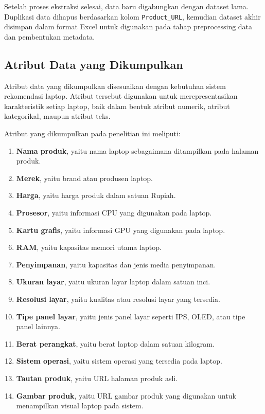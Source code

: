 Setelah proses ekstraksi selesai, data baru digabungkan dengan dataset lama. Duplikasi data dihapus berdasarkan kolom \texttt{Product\_URL}, kemudian dataset akhir disimpan dalam format Excel untuk digunakan pada tahap preprocessing data dan pembentukan metadata.

\subsection{Atribut Data yang Dikumpulkan}
Atribut data yang dikumpulkan disesuaikan dengan kebutuhan sistem rekomendasi laptop. Atribut tersebut digunakan untuk merepresentasikan karakteristik setiap laptop, baik dalam bentuk atribut numerik, atribut kategorikal, maupun atribut teks.

\noindent Atribut yang dikumpulkan pada penelitian ini meliputi:
\begin{enumerate}
\item \textbf{Nama produk}, yaitu nama laptop sebagaimana ditampilkan pada halaman produk.
\item \textbf{Merek}, yaitu brand atau produsen laptop.
\item \textbf{Harga}, yaitu harga produk dalam satuan Rupiah.
\item \textbf{Prosesor}, yaitu informasi CPU yang digunakan pada laptop.
\item \textbf{Kartu grafis}, yaitu informasi GPU yang digunakan pada laptop.
\item \textbf{RAM}, yaitu kapasitas memori utama laptop.
\item \textbf{Penyimpanan}, yaitu kapasitas dan jenis media penyimpanan.
\item \textbf{Ukuran layar}, yaitu ukuran layar laptop dalam satuan inci.
\item \textbf{Resolusi layar}, yaitu kualitas atau resolusi layar yang tersedia.
\item \textbf{Tipe panel layar}, yaitu jenis panel layar seperti IPS, OLED, atau tipe panel lainnya.
\item \textbf{Berat perangkat}, yaitu berat laptop dalam satuan kilogram.
\item \textbf{Sistem operasi}, yaitu sistem operasi yang tersedia pada laptop.
\item \textbf{Tautan produk}, yaitu URL halaman produk asli.
\item \textbf{Gambar produk}, yaitu URL gambar produk yang digunakan untuk menampilkan visual laptop pada sistem.
\end{enumerate}

